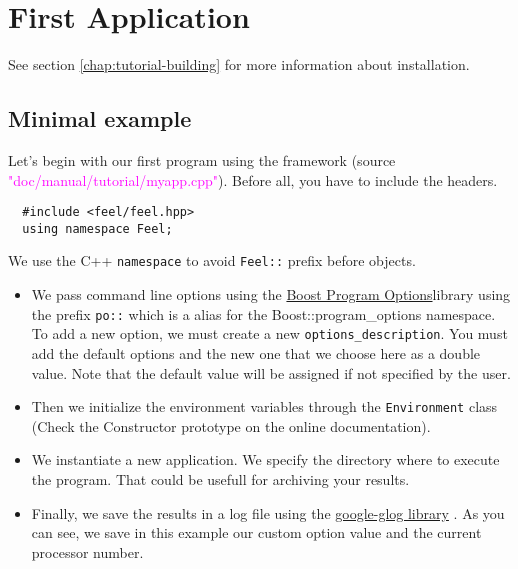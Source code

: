 %


\section{First \feel Application}
\label{sec:myapp}

See section \ref{chap:tutorial-building} for more information about \feel installation.

\subsection{Minimal example}

Let's begin with our first program using the \feel framework
(source \textcolor{magenta}{"doc/manual/tutorial/myapp.cpp"}).
Before all, you have to include the \feel headers.
%
\vspace{2mm}
\begin{lstlisting}
  #include <feel/feel.hpp>
  using namespace Feel;
\end{lstlisting}
\vspace{2mm}
%
We use the C++ \lstinline!namespace! to avoid \lstinline!Feel::! prefix before
\feel objects.
%
\vspace{2mm}

\vspace{2mm}
%
\begin{itemize}
\item
We pass command line options using the
\href{http://www.boost.org/doc/libs/1_53_0/doc/html/program_options.html}
{Boost Program Options}\footnotemark[1] library using the prefix \lstinline!po::! which is 
a \feel alias for the Boost::program\_options namespace.
%
%
To add a new \feel option, we must create a new
\feel \lstinline!options_description!. You must add the default \feel options
and the new one that we choose here as a double value. Note that the default
value will be assigned if not specified by the user.

\item
Then we initialize the environment variables through the \feel
\lstinline!Environment! class (Check the Constructor prototype on the online documentation).

\item
We instantiate a new application. We specify the directory where to execute the
program. That could be usefull for archiving your results.

\item
Finally, we save the results in a log file using the
\href{http://code.google.com/p/google-glog/}{google-glog library}
\footnotemark[2].
%
%
As you can see, we save in this example our custom option value and the
current processor number.

\end{itemize}


